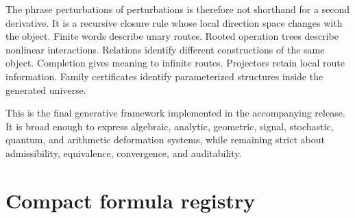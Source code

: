 \documentclass[11pt,openany]{report}
\theoremstyle{definition}
\theoremstyle{remark}
\begin{document}
The phrase perturbations of perturbations is therefore not shorthand for a second derivative. It is a recursive closure rule whose local direction space changes with the object. Finite words describe unary routes. Rooted operation trees describe nonlinear interactions. Relations identify different constructions of the same object. Completion gives meaning to infinite routes. Projectors retain local route information. Family certificates identify parameterized structures inside the generated universe.

This is the final generative framework implemented in the accompanying release. It is broad enough to express algebraic, analytic, geometric, signal, stochastic, quantum, and arithmetic deformation systems, while remaining strict about admissibility, equivalence, convergence, and auditability.

\appendix

\chapter{Compact formula registry}
\end{document}
